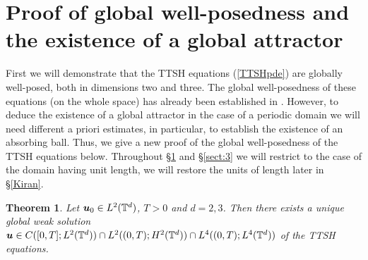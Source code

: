 \documentclass[11pt]{amsart}
\newcommand{\bu}{\mbox{\boldmath$u$}}
\newtheorem{theorem}[proposition]{Theorem}
\theoremstyle{definition}
\numberwithin{equation}{section}
\numberwithin{equation}{section}
\begin{document}
\section{\large Proof of global well-posedness and the existence of a global attractor}\label{sect:2}

First we will demonstrate that the TTSH equations (\ref{TTSHpde}) are globally well-posed, both in dimensions two and three. The global well-posedness of these equations (on the whole space) has already been established in \cite{Zanger2016}. However, to deduce the existence of a global attractor in the case of a periodic domain we will need different a priori estimates, in particular, to establish the existence of an absorbing ball. Thus, we give a new proof of the global well-posedness of the TTSH equations below. Throughout \S \ref{sect:2} and \S \ref{sect:3} we will restrict to the case of the domain having unit length, we will restore the units of length later in \S \ref{Kiran}.
\begin{theorem} \label{weaksolutionsthm}
Let $\bu_0 \in L^2 (\mathbb{T}^d)$, $T > 0$ and $d=2,3$. Then there exists a unique global weak solution $\bu \in C([0,T];L^2(\mathbb{T}^d)) \cap L^2 ((0,T); H^2 (\mathbb{T}^d)) \cap L^4 ((0,T); L^4 (\mathbb{T}^d))$ of the TTSH equations.
\end{theorem}
\end{document}
